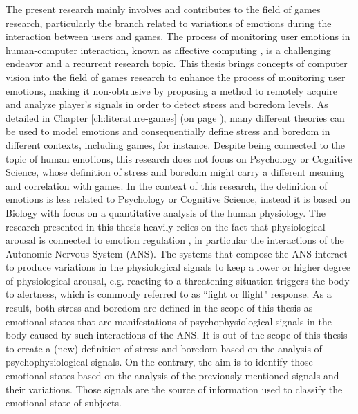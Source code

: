 The present research mainly involves and contributes to the field of games research, particularly the branch related to variations of emotions during the interaction between users and games. The process of monitoring user emotions in human-computer interaction, known as affective computing \parencite{picard2000affective}, is a challenging endeavor and a recurrent research topic. This thesis brings concepts of computer vision into the field of games research to enhance the process of monitoring user emotions, making it non-obtrusive by proposing a method to remotely acquire and analyze player's signals in order to detect stress and boredom levels. As detailed in Chapter \ref{ch:literature-games} (on page \pageref{ch:literature-games}), many different theories can be used to model emotions and consequentially define stress and boredom in different contexts, including games, for instance. Despite being connected to the topic of human emotions, this research does not focus on Psychology or Cognitive Science, whose definition of stress and boredom might carry a different meaning and correlation with games. In the context of this research, the definition of emotions is less related to Psychology or Cognitive Science, instead it is based on Biology with focus on a quantitative analysis of the human physiology. The research presented in this thesis heavily relies on the fact that physiological arousal is connected to emotion regulation \parencite{appelhans2006heart,schubert2009effects}, in particular the interactions of the Autonomic Nervous System (ANS). The systems that compose the ANS interact to produce variations in the physiological signals to keep a lower or higher degree of physiological arousal, e.g. reacting to a threatening situation triggers the body to alertness, which is commonly referred to as ``fight or flight" response. As a result, both stress and boredom are defined in the scope of this thesis as emotional states that are manifestations of psychophysiological signals in the body caused by such interactions of the ANS. It is out of the scope of this thesis to create a (new) definition of stress and boredom based on the analysis of psychophysiological signals. On the contrary, the aim is to identify those emotional states based on the analysis of the previously mentioned signals and their variations. Those signals are the source of information used to classify the emotional state of subjects.


